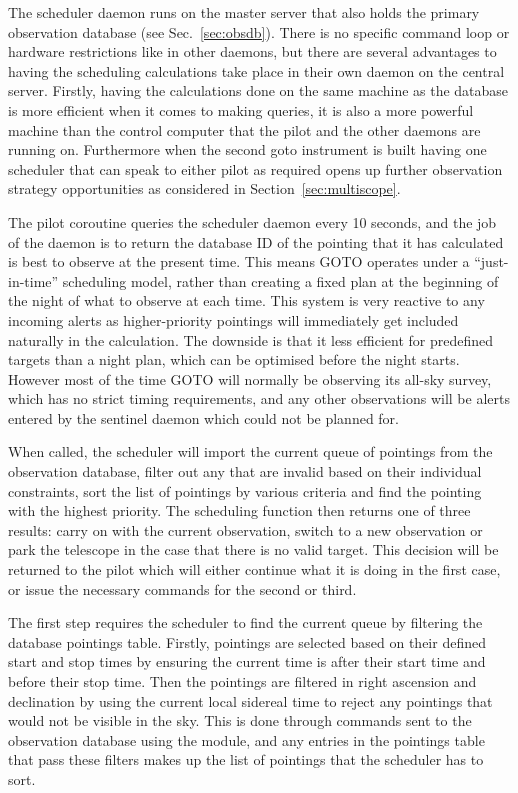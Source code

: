\begin{colsection}
\begin{colsection}
The scheduler daemon runs on the master server that also holds the primary observation database (see Sec.~\ref{sec:obsdb}). There is no specific command loop or hardware restrictions like in other daemons, but there are several advantages to having the scheduling calculations take place in their own daemon on the central server. Firstly, having the calculations done on the same machine as the database is more efficient when it comes to making queries, it is also a more powerful machine than the control computer that the pilot and the other daemons are running on. Furthermore when the second \gls{goto} instrument is built having one scheduler that can speak to either pilot as required opens up further observation strategy opportunities as considered in Section~\ref{sec:multiscope}.

The pilot  coroutine queries the scheduler daemon every 10 seconds, and the job of the daemon is to return the database ID of the pointing that it has calculated is best to observe at the present time. This means GOTO operates under a ``just-in-time'' scheduling model, rather than creating a fixed plan at the beginning of the night of what to observe at each time. This system is very reactive to any incoming alerts as higher-priority pointings will immediately get included naturally in the calculation. The downside is that it less efficient for predefined targets than a night plan, which can be optimised before the night starts. However most of the time GOTO will normally be observing its all-sky survey, which has no strict timing requirements, and any other observations will be alerts entered by the sentinel daemon which could not be planned for.

When called, the scheduler will import the current queue of pointings from the observation database, filter out any that are invalid based on their individual constraints, sort the list of pointings by various criteria and find the pointing with the highest priority. The scheduling function then returns one of three results: carry on with the current observation, switch to a new observation or park the telescope in the case that there is no valid target. This decision will be returned to the pilot which will either continue what it is doing in the first case, or issue the necessary commands for the second or third.

The first step requires the scheduler to find the current queue by filtering the database pointings table. Firstly, pointings are selected based on their defined start and stop times by ensuring the current time is after their start time and before their stop time. Then the pointings are filtered in right ascension and declination by using the current local sidereal time to reject any pointings that would not be visible in the sky. This is done through commands sent to the observation database using the  module, and any entries in the pointings table that pass these filters makes up the list of pointings that the scheduler has to sort.


\end{colsection}
\end{colsection}
